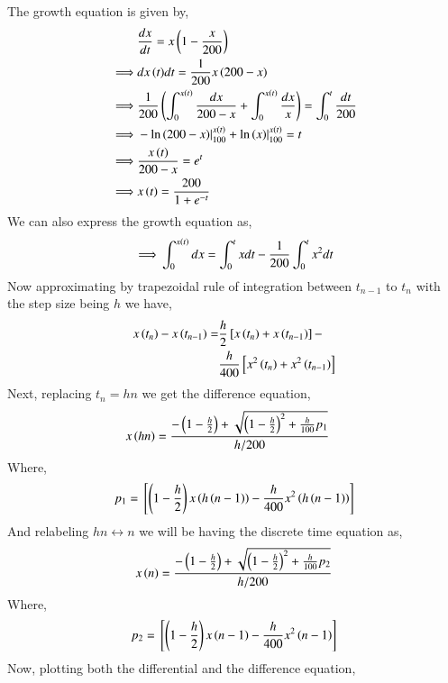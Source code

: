 \documentclass[journal,12pt,twocolumn]{IEEEtran}
\theoremstyle{remark}
\begin{document}
\solution

The growth equation is given by,
\begin{align}
    &\frac{dx}{dt}=x\left(1-\frac{x}{200}\right) \\
    \implies &{dx\left(t\right)}{dt}=\frac{1}{200}x\left(200-x\right) \\
    \implies &\frac{1}{200}\left(\int_{0}^{x\left(t\right)}\frac{dx}{200-x}+\int_{0}^{x\left(t\right)}\frac{dx}{x}\right)=\int_{0}^{t}\frac{dt}{200} \\
    \implies &-\ln{\ensuremath{\left(200-x\right)}}|_{100}^{x\left(t\right)}+\ln{\ensuremath{\left(x\right)}}|_{100}^{x\left(t\right)}=t \\
    \implies &\frac{x\left(t\right)}{200-x}=e^t \\
    \implies &x\left(t\right)=\frac{200}{1+e^{-t}}
\end{align}
We can also express the growth equation as,
\begin{align}
    \implies &\int_{0}^{x\left(t\right)}dx=\int_{0}^{t}xdt-\frac{1}{200}\int_{0}^{t}x^2dt \\
\end{align}
Now approximating by trapezoidal rule of integration between $t_{n-1}$ to $t_n$ with the step size being $h$ we have,
\begin{align}
    \begin{split}
        x\left(t_n\right)-x\left(t_{n-1}\right)=&\frac{h}{2}{}\left[x\left(t_n\right)+x\left(t_{n-1}\right)\right]- \\
        &\frac{h}{400}{}\left[x^2\left(t_n\right)+x^2\left(t_{n-1}\right)\right]
    \end{split}
\end{align}
Next, replacing $t_{n}=hn$ we get the difference equation,
\begin{align}
    &x\left(hn\right)=\frac{-\left(1-\frac{h}{2}\right)+\sqrt{\left(1-\frac{h}{2}\right)^2+\frac{h}{100}p_1}}{h/200}
\end{align}
Where,
\begin{align}
    p_1={}\left[\left(1-\frac{h}{2}\right)x\left(h\left(n-1\right)\right)-\frac{h}{400}x^2\left(h\left(n-1\right)\right)\right]
\end{align}
And relabeling $hn\longleftrightarrow n$ we will be having the discrete time equation as,
\begin{align}
    x\left(n\right)=\frac{-\left(1-\frac{h}{2}\right)+\sqrt{\left(1-\frac{h}{2}\right)^2+\frac{h}{100}p_2}}{h/200} \label{eq:A}
\end{align}
Where,
\begin{align}
    p_2={}\left[\left(1-\frac{h}{2}\right)x\left(n-1\right)-\frac{h}{400}x^2\left(n-1\right)\right]
\end{align}
Now, plotting both the differential and the difference equation,
\end{document}
